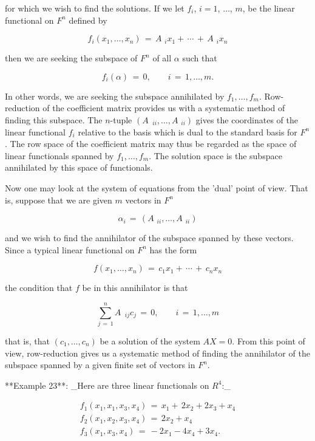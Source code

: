 for which we wish to find the solutions. If we let \(f_{i}\), \(i=1\), \(\ldots\), \(m\), be the linear functional on \(F^{n}\) defined by

\[f_{i}(x_{1},\ldots,x_{n})\,=\,A_{\,\,\,i}x_{1}+\,\cdots\,+\,A_{\,\,\,i}x_{n}\]

then we are seeking the subspace of \(F^{n}\) of all \(\alpha\) such that

\[f_{i}(\alpha)\,=\,0,\qquad i\,=\,1,\ldots,m.\]

In other words, we are seeking the subspace annihilated by \(f_{1},\ldots,f_{m}\). Row-reduction of the coefficient matrix provides us with a systematic method of finding this subspace. The \(n\)-tuple \((A_{\,\,\,\,i\!i},\ldots,A_{\,\,\,i\!i})\) gives the coordinates of the linear functional \(f_{i}\) relative to the basis which is dual to the standard basis for \(F^{n}\). The row space of the coefficient matrix may thus be regarded as the space of linear functionals spanned by \(f_{1},\ldots,f_{m}\). The solution space is the subspace annihilated by this space of functionals.

Now one may look at the system of equations from the 'dual' point of view. That is, suppose that we are given \(m\) vectors in \(F^{n}\)

\[\alpha_{i}\,=\,(A_{\,\,\,i\!i},\ldots,A_{\,\,\,i\!i})\]

and we wish to find the annihilator of the subspace spanned by these vectors. Since a typical linear functional on \(F^{n}\) has the form

\[f(x_{1},\ldots,x_{n})\,=\,c_{1}x_{1}+\,\cdots\,+\,c_{n}x_{n}\]

the condition that \(f\) be in this annihilator is that

\[\sum_{j\,=\,1}^{n}A_{\,\,\,\,i\!j}c_{j}\,=\,0,\qquad i\,=\,1,\ldots,m\]

that is, that \((c_{1},\ldots,c_{n})\) be a solution of the system \(AX=0\). From this point of view, row-reduction gives us a systematic method of finding the annihilator of the subspace spanned by a given finite set of vectors in \(F^{n}\).

**Example 23**: _Here are three linear functionals on \(R^{4}\):_

\[\begin{array}{l}f_{1}(x_{1},x_{1},x_{3},x_{4})\,=\,x_{1}+\,2x_{2}+2x_{3}+x_{4 }\\ f_{2}(x_{1},x_{2},x_{3},x_{4})\,=\,2x_{2}+x_{4}\\ f_{3}(x_{1},x_{3},x_{4})\,=\,-2x_{1}-4x_{4}+3x_{4}.\end{array}\]

